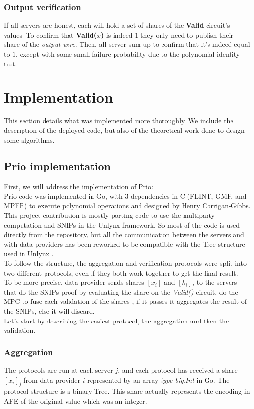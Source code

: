 \documentclass{article}
\begin{document}
\subsubsection{Output verification}
If all servers are honest, each will hold a set of shares of the \textbf{Valid} circuit's values. To confirm that \textbf{Valid($x$)} is indeed $1$ they only need to publish their share of the \textit{output wire}. Then, all server sum up to confirm that it's indeed equal to $1$, except with some small failure probability due to the polynomial identity test.


\section{Implementation}
This section details what was implemented more thoroughly. We include the description of the deployed code, but also of the theoretical work done to design some algorithms.

\subsection{Prio implementation}
First, we will address the implementation of Prio:\\

Prio code \cite{priocode} was implemented in Go, with 3 dependencies in C (FLINT, GMP, and MPFR) to execute polynomial operations and designed by Henry Corrigan-Gibbs.\\
This project contribution is mostly porting code to use the multiparty computation and SNIPs in the Unlynx framework. So most of the code is used directly from the repository, but all the communication between the servers and with data providers has been reworked to be compatible with the Tree structure used in Unlynx \cite{unlynxcode}.\\
To follow the structure, the aggregation and verification protocols were split into two different protocols, even if they both work together to get the final result.\\
To be more precise, data provider sends shares $[x_i]$ and $[h_i]$, to the servers that do the SNIPs proof by evaluating the share on the \textit{Valid()} circuit, do the MPC to fuse each validation of the shares , if it passes it aggregates the result of the SNIPs, else it will discard.\\
Let's start by describing the easiest protocol, the aggregation and then the validation.\\
\subsubsection*{Aggregation}
The protocols are run at each server $j$, and each protocol has received a share $[x_i]_j$ from data provider $i$ represented by an array \textit{type big.Int} in Go. The protocol structure is a binary Tree.
This share actually represents the encoding in AFE of the original value which was an integer.\\
\end{document}

